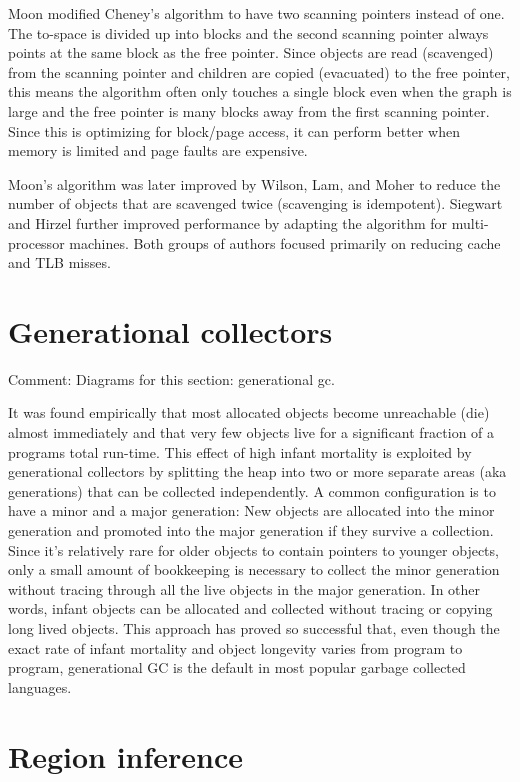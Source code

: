 \documentclass[a4paper,oneside]{memoir}
\newcommand{\makecomment}[1]{{\color{red} Comment: #1}}
\begin{document}
Moon modified Cheney's algorithm to have two scanning pointers instead of one.
The to-space is divided up into blocks and the second scanning pointer always
points at the same block as the free pointer. Since objects are read (scavenged)
from the scanning pointer and children are copied (evacuated) to the free pointer,
this means the algorithm often only touches a single block even when the graph
is large and the free pointer is many blocks away from the first scanning pointer.
Since this is optimizing for block/page access, it can perform better when memory
is limited and page faults are expensive.

Moon's algorithm was later improved by Wilson, Lam, and Moher to reduce the
number of objects that are scavenged twice (scavenging is idempotent). Siegwart
and Hirzel further improved performance by adapting the algorithm for
multi-processor machines. Both groups of authors focused primarily on reducing
cache and TLB misses.

\section{Generational collectors}
\makecomment{Diagrams for this section: generational gc.}

It was found empirically that most allocated objects become unreachable (die)
almost immediately and that very few objects live for a significant fraction
of a programs total run-time. This effect of high infant mortality is exploited
by generational collectors by splitting the heap into two or more separate areas
(aka generations) that can be collected independently. A common configuration is
to have a minor and a major generation: New objects are allocated into the minor
generation and promoted into the major generation if they survive a collection.
Since it's relatively rare for older objects to contain pointers to younger
objects, only a small amount of bookkeeping is necessary to collect the minor
generation without tracing through all the live objects in the major generation.
In other words, infant objects can be allocated and collected without tracing or
copying long lived objects. This approach has proved so successful that, even
though the exact rate of infant mortality and object longevity varies from
program to program, generational GC is the default in most popular garbage
collected languages.

\section{Region inference}
\end{document}
